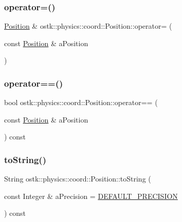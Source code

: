 \subsubsection{\texorpdfstring{operator=()}{operator=()}}
{\footnotesize\ttfamily \hyperlink{classostk_1_1physics_1_1coord_1_1_position}{Position} \& ostk\+::physics\+::coord\+::\+Position\+::operator= (\begin{DoxyParamCaption}\item[{const \hyperlink{classostk_1_1physics_1_1coord_1_1_position}{Position} \&}]{a\+Position }\end{DoxyParamCaption})}

\mbox{\label{classostk_1_1physics_1_1coord_1_1_position_a5384658411f001cf57747382ab4fd461}} 
\subsubsection{\texorpdfstring{operator==()}{operator==()}}
{\footnotesize\ttfamily bool ostk\+::physics\+::coord\+::\+Position\+::operator== (\begin{DoxyParamCaption}\item[{const \hyperlink{classostk_1_1physics_1_1coord_1_1_position}{Position} \&}]{a\+Position }\end{DoxyParamCaption}) const}

\mbox{\label{classostk_1_1physics_1_1coord_1_1_position_a4b5e999fb0fd55eda5637efa9694852e}} 
\subsubsection{\texorpdfstring{to\+String()}{toString()}}
{\footnotesize\ttfamily String ostk\+::physics\+::coord\+::\+Position\+::to\+String (\begin{DoxyParamCaption}\item[{const Integer \&}]{a\+Precision = {\ttfamily \hyperlink{_velocity_8hpp_a6d81881a7883657dbc659ca545d9085d}{D\+E\+F\+A\+U\+L\+T\+\_\+\+P\+R\+E\+C\+I\+S\+I\+ON}} }\end{DoxyParamCaption}) const}

